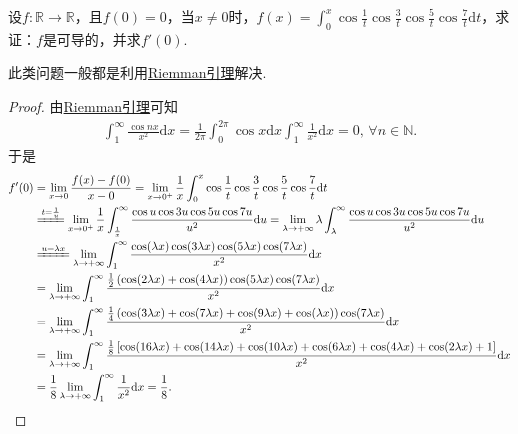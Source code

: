 \documentclass[../../main.tex]{subfiles}%
\begin{document}
\begin{example}
设$f:\mathbb{R}\to\mathbb{R}$，且$f(0)=0$，当$x\neq0$时，$f(x)=\int_0^x\cos\frac{1}{t}\cos\frac{3}{t}\cos\frac{5}{t}\cos\frac{7}{t}\mathrm{d}t$，求证：$f$是可导的，并求$f'(0)$.
\end{example}
\begin{note}
此类问题一般都是利用\hyperref[theorem:Riemann引理]{Riemman引理}解决.
\end{note}
\begin{proof}

由\hyperref[theorem:Riemann引理]{Riemman引理}可知
\begin{align*}
\int_1^{\infty} \frac{\cos nx}{x^2} \mathrm{d}x = \frac{1}{2\pi} \int_0^{2\pi} \cos x \mathrm{d}x \int_1^{\infty} \frac{1}{x^2} \mathrm{d}x = 0, \, \forall n \in \mathbb{N}.
\end{align*}
于是
\begin{align*}
f'(0) &= \lim_{x \to 0} \frac{f(x) - f(0)}{x - 0} = \lim_{x \to 0^+} \frac{1}{x} \int_0^x \cos \frac{1}{t} \cos \frac{3}{t} \cos \frac{5}{t} \cos \frac{7}{t} \mathrm{d}t \\
&\xlongequal{t = \frac{1}{u}} \lim_{x \to 0^+} \frac{1}{x} \int_{\frac{1}{x}}^{\infty} \frac{\cos u \cos 3u \cos 5u \cos 7u}{u^2} \mathrm{d}u = \lim_{\lambda \to +\infty} \lambda \int_{\lambda}^{\infty} \frac{\cos u \cos 3u \cos 5u \cos 7u}{u^2} \mathrm{d}u \\
&\xlongequal{u = \lambda x} \lim_{\lambda \to +\infty} \int_1^{\infty} \frac{\cos(\lambda x) \cos(3\lambda x) \cos(5\lambda x) \cos(7\lambda x)}{x^2} \mathrm{d}x \\
&= \lim_{\lambda \to +\infty} \int_1^{\infty} \frac{\frac{1}{2} \left( \cos(2\lambda x) + \cos(4\lambda x) \right) \cos(5\lambda x) \cos(7\lambda x)}{x^2} \mathrm{d}x \\
&= \lim_{\lambda \to +\infty} \int_1^{\infty} \frac{\frac{1}{4} \left( \cos(3\lambda x) + \cos(7\lambda x) + \cos(9\lambda x) + \cos(\lambda x) \right) \cos(7\lambda x)}{x^2} \mathrm{d}x \\
&= \lim_{\lambda \to +\infty} \int_1^{\infty} \frac{\frac{1}{8} \left[ \cos(16\lambda x) + \cos(14\lambda x) + \cos(10\lambda x) + \cos(6\lambda x) + \cos(4\lambda x) + \cos(2\lambda x) + 1 \right]}{x^2} \mathrm{d}x \\
&= \frac{1}{8} \lim_{\lambda \to +\infty} \int_1^{\infty} \frac{1}{x^2} \mathrm{d}x = \frac{1}{8}.
\end{align*}

\end{proof}
\end{document}
